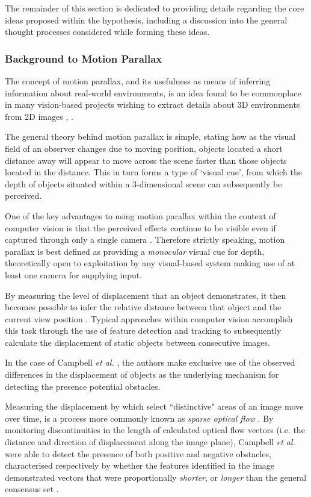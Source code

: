 The remainder of this section is dedicated to providing details regarding the core ideas proposed within the hypothesis, including a discussion into the general thought processes considered while forming these ideas.

\subsubsection{Background to Motion Parallax}

The concept of motion parallax, and its usefulness as means of inferring information about real-world environments, is an idea found to be commonplace in many vision-based projects wishing to extract details about 3D environments from 2D images \cite{}, \cite{}.  

The general theory behind motion parallax is simple, stating how as the visual field of an observer changes due to moving position, objects located a short distance away will appear to move across the scene faster than those objects located in the distance. This in turn forms a type of `visual cue', from which the depth of objects situated within a 3-dimensional scene can subsequently be perceived.

One of the key advantages to using motion parallax within the context of computer vision is that the perceived effects continue to be visible even if captured through only a single camera \cite{}. Therefore strictly speaking, motion parallax is best defined as providing a \textit{monocular} visual cue for depth, theoretically open to exploitation by any visual-based system making use of at least one camera for supplying input.
 
 By measuring the level of displacement that an object demonstrates, it then becomes possible to infer the relative distance between that object and the current view position \cite{}. Typical approaches within computer vision accomplish this task through the use of feature detection and tracking to subsequently calculate the displacement of static objects between consecutive images. 

In the case of Campbell \textit{et al.} \cite{campbell}, the authors make exclusive use of the observed differences in the displacement of objects as the underlying mechanism for  detecting the presence potential obstacles. 

Measuring the displacement by which select ``distinctive" areas of an image move over time, is a process more commonly known as \textit{sparse optical flow} \cite{sparse-optical-flow}. By monitoring discontinuities in the length of calculated optical flow vectors (i.e. the distance and direction of displacement along the image plane), Campbell \textit{et al.} were able to detect the presence of both positive and negative obstacles, characterised respectively by whether the features identified in the image demonstrated vectors that were proportionally \textit{shorter}, or \textit{longer} than the general consensus set \cite{campbell}.


